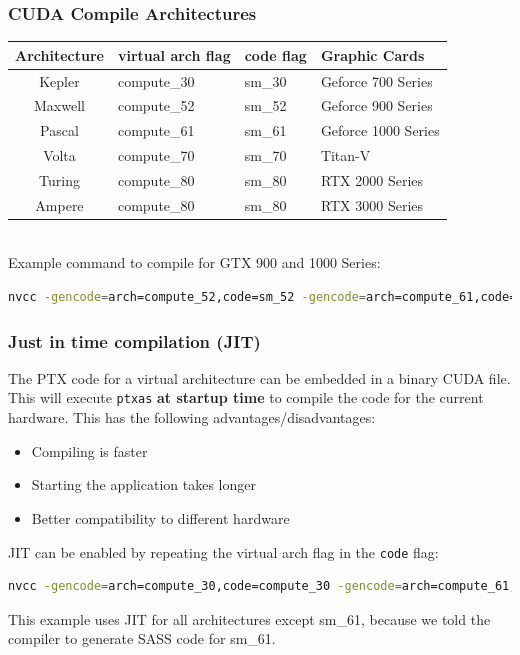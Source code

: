 \documentclass[aspectratio=169,handout]{beamer}
\begin{document}
\begin{frame}[fragile]
\frametitle{CUDA Compile Architectures}
	
		\begin{tabular}{c|l|l|l}
		Architecture & virtual arch flag & code flag & Graphic Cards\\	
		\hline
		Kepler & compute\_30 & sm\_30 & Geforce 700 Series\\
		Maxwell & compute\_52 & sm\_52 & Geforce 900 Series\\
		Pascal & compute\_61 & sm\_61 & Geforce 1000 Series\\
		Volta & compute\_70 & sm\_70 & Titan-V\\
		Turing & compute\_80 & sm\_80 & RTX 2000 Series\\	
	    Ampere & compute\_80 & sm\_80 & RTX 3000 Series\\	
	\end{tabular}
\\
	\vspace{0.6cm}
	Example command to compile for GTX 900 and 1000 Series:
\begin{lstlisting}[language=bash]
nvcc -gencode=arch=compute_52,code=sm_52 -gencode=arch=compute_61,code=sm_61 main.cu -o main
\end{lstlisting}
\end{frame}


\begin{frame}[fragile]
\frametitle{Just in time compilation (JIT)}
The PTX code for a virtual architecture can be embedded in a binary CUDA file. This will execute \texttt{ptxas} \textbf{at startup time} to compile the code for the current hardware. This has the following advantages/disadvantages:
\begin{itemize}
	\item Compiling is faster
	\item Starting the application takes longer
	\item Better compatibility to  different hardware
\end{itemize}
JIT can be enabled by repeating the virtual arch flag in the \texttt{code} flag:
\begin{lstlisting}[language=bash]
nvcc -gencode=arch=compute_30,code=compute_30 -gencode=arch=compute_61,code=sm_61 main.cu -o main
\end{lstlisting}
This example uses JIT for all architectures except sm\_61, because we told the compiler to generate SASS code for sm\_61.
\end{frame}
\end{document}
